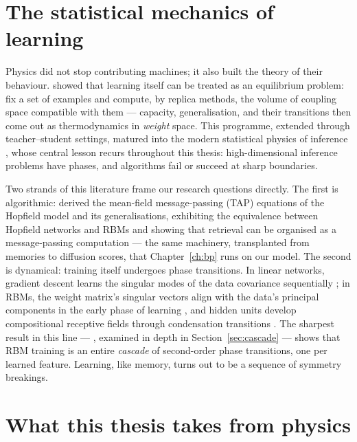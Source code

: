 \section{The statistical mechanics of learning}\label{sec:statmech-learning}

Physics did not stop contributing machines; it also built the theory of
their behaviour. \citet{gardner1988space} showed that learning itself can be
treated as an equilibrium problem: fix a set of examples and compute, by
replica methods, the volume of coupling space compatible with them ---
capacity, generalisation, and their transitions then come out as
thermodynamics in \emph{weight} space. This programme, extended through
teacher--student settings, matured into the modern statistical physics of
inference \citep{zdeborova2016statistical}, whose central lesson recurs
throughout this thesis: high-dimensional inference problems have phases, and
algorithms fail or succeed at sharp boundaries.

Two strands of this literature frame our research questions directly. The
first is algorithmic: \citet{mezard2017meanfield} derived the mean-field
message-passing (TAP) equations of the Hopfield model and its
generalisations, exhibiting the equivalence between Hopfield networks and
RBMs and showing that retrieval can be organised as a message-passing
computation --- the same machinery, transplanted from memories to diffusion
scores, that Chapter~\ref{ch:bp} runs on our model. The second is dynamical:
training itself undergoes phase transitions. In linear networks, gradient
descent learns the singular modes of the data covariance sequentially
\citep{saxe2014exact}; in RBMs, the weight matrix's singular vectors align
with the data's principal components in the early phase of learning
\citep{decelle2017spectral}, and hidden units develop compositional
receptive fields through condensation transitions
\citep{tubiana2017emergence}. The sharpest result in this line ---
\citet{bachtis2024cascade}, examined in depth in
Section~\ref{sec:cascade} --- shows that RBM training is an entire
\emph{cascade} of second-order phase transitions, one per learned feature.
Learning, like memory, turns out to be a sequence of symmetry breakings.

\section{What this thesis takes from physics}


